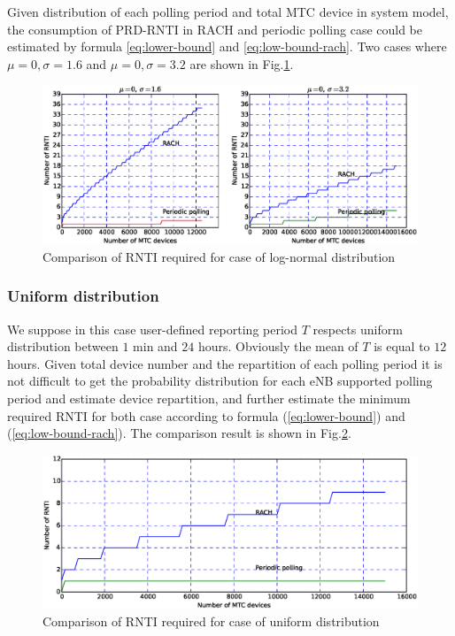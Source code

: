 Given distribution of each polling period and total MTC device in system model, the consumption of PRD-RNTI in RACH and periodic polling case could be estimated by formula \ref{eq:lower-bound} and \ref{eq:low-bound-rach}. Two cases where $\mu=0, \sigma=1.6$ and $\mu=0, \sigma=3.2$ are shown in Fig.\ref{fig:log-normal-RNTI-consumption}.
\begin{figure}[!t]
	\centering
	\includegraphics[width=\linewidth]{Chapter6/Figures/log-normal.eps}
	\caption{Comparison of RNTI required for case of log-normal distribution}
	\label{fig:log-normal-RNTI-consumption}
\end{figure}

\subsubsection{Uniform distribution}
We suppose in this case user-defined reporting period $T$ respects uniform distribution between $1$ min and $24$ hours. Obviously the mean of $T$ is equal to $12$ hours. Given total device number and the repartition of each polling period 
it is not difficult to get the probability distribution for each eNB supported polling period and estimate device repartition, and further estimate the minimum required RNTI for both case according to formula (\ref{eq:lower-bound}) and (\ref{eq:low-bound-rach}). The comparison result is shown in Fig.\ref{fig:uniform-RNTI-consumption}.

\begin{figure}[!t]
	\centering
	\includegraphics[width=\linewidth]{Chapter6/Figures/uniform.eps}
	\caption{Comparison of RNTI required for case of uniform distribution}
	\label{fig:uniform-RNTI-consumption}
\end{figure}

